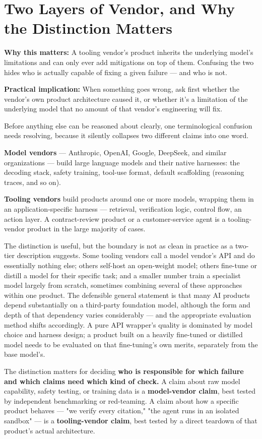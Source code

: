 \section{Two Layers of Vendor, and Why the Distinction Matters}

\textbf{Why this matters:} A tooling vendor's product inherits the underlying model's limitations and can only ever add mitigations on top of them. Confusing the two hides who is actually capable of fixing a given failure --- and who is not.

\textbf{Practical implication:} When something goes wrong, ask first whether the vendor's own product architecture caused it, or whether it's a limitation of the underlying model that no amount of that vendor's engineering will fix.

Before anything else can be reasoned about clearly, one terminological confusion needs resolving, because it silently collapses two different claims into one word.

\textbf{Model vendors} --- Anthropic, OpenAI, Google, DeepSeek, and similar organizations --- build large language models and their native harnesses: the decoding stack, safety training, tool-use format, default scaffolding (reasoning traces, and so on).

\textbf{Tooling vendors} build products around one or more models, wrapping them in an application-specific harness --- retrieval, verification logic, control flow, an action layer. A contract-review product or a customer-service agent is a tooling-vendor product in the large majority of cases.

The distinction is useful, but the boundary is not as clean in practice as a two-tier description suggests. Some tooling vendors call a model vendor's API and do essentially nothing else; others self-host an open-weight model; others fine-tune or distill a model for their specific task; and a smaller number train a specialist model largely from scratch, sometimes combining several of these approaches within one product. The defensible general statement is that many AI products depend substantially on a third-party foundation model, although the form and depth of that dependency varies considerably --- and the appropriate evaluation method shifts accordingly. A pure API wrapper's quality is dominated by model choice and harness design; a product built on a heavily fine-tuned or distilled model needs to be evaluated on that fine-tuning's own merits, separately from the base model's.

The distinction matters for deciding \textbf{who is responsible for which failure and which claims need which kind of check.} A claim about raw model capability, safety testing, or training data is a \textbf{model-vendor claim}, best tested by independent benchmarking or red-teaming. A claim about how a specific product behaves --- "we verify every citation," "the agent runs in an isolated sandbox" --- is a \textbf{tooling-vendor claim}, best tested by a direct teardown of that product's actual architecture.

